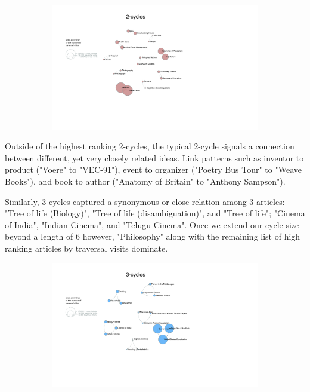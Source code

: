 \documentclass[twoside]{article}
\begin{document}
\begin{figure}[H]
\centering
\caption{highest ranking 2-Cycles}
    \begin{subfigure}[b]{0.8\textwidth}
        \includegraphics[width=\textwidth]{graphics/2_cycles.pdf}
    \end{subfigure}
\end{figure}



Outside of the highest ranking 2-cycles, the typical 2-cycle signals a connection between different, yet very closely related ideas. 
Link patterns such as inventor to product ("Voere" to "VEC-91"), event to organizer ("Poetry Bus Tour" to "Weave Books"), and book to author ("Anatomy of Britain" to "Anthony Sampson").

Similarly, 3-cycles captured a synonymous or close relation among 3 articles: "Tree of life (Biology)", "Tree of life (disambiguation)", 
and "Tree of life"; "Cinema of India", "Indian Cinema", and "Telugu Cinema". Once we extend our cycle size beyond a length of 6 however, 
"Philosophy" along with the remaining list of high ranking articles by traversal visits dominate.

\begin{figure}[H]
\centering
\caption{highest ranking 3-Cycles}
    \begin{subfigure}[b]{0.8\textwidth}
        \includegraphics[width=\textwidth]{graphics/3_cycles.pdf}
    \end{subfigure}
\end{figure}
\end{document}
